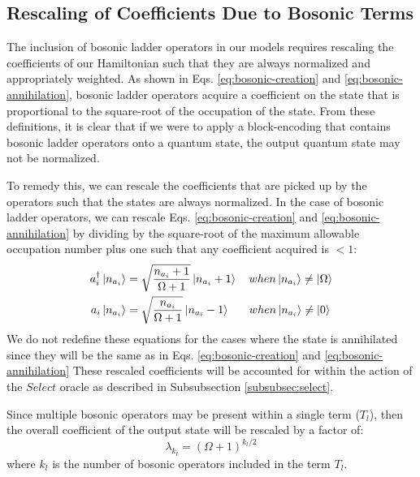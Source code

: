 \subsection{Rescaling of Coefficients Due to Bosonic Terms}
\label{subsec:rescaling}

The inclusion of bosonic ladder operators in our models requires rescaling the coefficients of our Hamiltonian such that they are always normalized and appropriately weighted.
As shown in Eqs. \ref{eq:bosonic-creation} and \ref{eq:bosonic-annihilation}, bosonic ladder operators acquire a coefficient on the state that is proportional to the square-root of the occupation of the state.
From these definitions, it is clear that if we were to apply a block-encoding that contains bosonic ladder operators onto a quantum state, the output quantum state may not be normalized.

To remedy this, we can rescale the coefficients that are picked up by the operators such that the states are always normalized.
In the case of bosonic ladder operators, we can rescale Eqs. \ref{eq:bosonic-creation} and \ref{eq:bosonic-annihilation} by dividing by the square-root of the maximum allowable occupation number plus one such that any coefficient acquired is $< 1$:
\begin{equation}
    \begin{split}
        a_i^\dagger \ket{n_{a_i}} &= \sqrt{\frac{n_{a_i} + 1}{\Omega + 1}} \ket{n_{a_i} + 1} \hspace{1em} when \ket{n_{a_i}} \neq \ket{\Omega} \\
        a_i  \ket{n_{a_i}} &= \sqrt{\frac{n_{a_i}}{\Omega + 1}} \ket{n_{a_i} - 1} \hspace{1.7em} when \ket{n_{a_i}} \neq \ket{0}
    \end{split}
\end{equation}
We do not redefine these equations for the cases where the state is annihilated since they will be the same as in Eqs.  \ref{eq:bosonic-creation} and \ref{eq:bosonic-annihilation}
These rescaled coefficients will be accounted for within the action of the $Select$ oracle as described in Subsubsection \ref{subsubsec:select}.

Since multiple bosonic operators may be present within a single term ($T_l$), then the overall coefficient of the output state will be rescaled by a factor of:
\begin{equation}
    \lambda_{k_l} = (\Omega + 1)^{k_l/2}
\end{equation}
where $k_l$ is the number of bosonic operators included in the term $T_l$.


